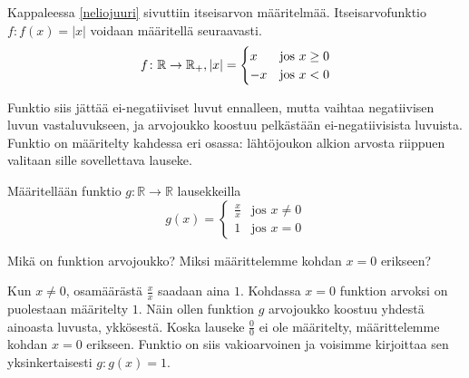 Kappaleessa \ref{neliojuuri} sivuttiin itseisarvon määritelmää. Itseisarvofunktio $f: f(x) = \lvert x \rvert$ voidaan määritellä seuraavasti. \\ 
$$
f\colon \mathbb{R} \to \mathbb{R_+}, \\ \lvert x \rvert = \begin{cases}
                 x & \text{jos } x \geq 0 \\
                 -x & \text{jos } x < 0
              
                \end{cases}
$$

Funktio siis jättää ei-negatiiviset luvut ennalleen, mutta vaihtaa negatiivisen luvun vastaluvukseen, ja arvojoukko koostuu pelkästään ei-negatiivisista luvuista. Funktio on määritelty kahdessa eri osassa: lähtöjoukon alkion arvosta riippuen valitaan sille sovellettava lauseke.

\begin{esimerkki}
 
 Määritellään funktio $g\colon \mathbb{R} \to \mathbb{R}$ lausekkeilla
 $$
 g(x) = \begin{cases}
         \frac{x}{x} & \text{jos } x \neq 0 \\
         1 & \text{jos } x = 0
        \end{cases}
$$
 
Mikä on funktion arvojoukko? Miksi määrittelemme kohdan $x = 0$ erikseen?

\begin{esimratk}
Kun $x \neq 0$, osamäärästä $\frac{x}{x}$ saadaan aina $1$. Kohdassa $x=0$ funktion arvoksi on puolestaan määritelty $1$. Näin ollen funktion $g$ arvojoukko koostuu yhdestä ainoasta luvusta, ykkösestä. Koska lauseke $\frac{0}{0}$ ei ole määritelty, määrittelemme kohdan $x=0$ erikseen. Funktio on siis vakioarvoinen ja voisimme kirjoittaa sen yksinkertaisesti $g\colon g(x) = 1$. 

\end{esimratk}

 
\end{esimerkki}
